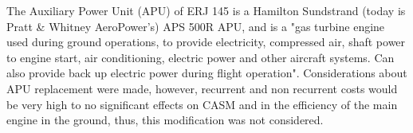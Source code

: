 The Auxiliary Power Unit (APU) of ERJ 145 is a Hamilton Sundstrand (today is Pratt \& Whitney AeroPower's) APS 500R APU, and is a "gas turbine engine used during ground operations, to provide electricity, compressed air, shaft power to engine start, air conditioning, electric power and other aircraft systems. Can also provide back up electric power during flight operation".
Considerations about APU replacement were made, however, recurrent and non recurrent costs would be very high to no significant effects on CASM and in the efficiency of the main engine in the ground, thus, this modification was not considered.
